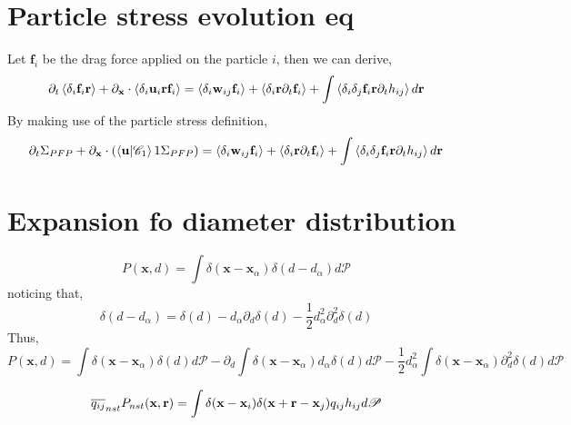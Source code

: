 \section*{Particle stress evolution eq}
Let $\textbf{f}_i$ be the drag force applied on the particle $i$, then we can derive,
\begin{equation*}
    \partial_t \left<\delta_i \textbf{f}_i\textbf{r}\right> 
  + \partial_\textbf{x} \cdot \left<\delta_i\textbf{u}_i \textbf{r} \textbf{f}_i\right>
  = \left<\delta_i\textbf{w}_{ij} \textbf{f}_i\right>
  + \left<\delta_i\textbf{r}\partial_t  \textbf{f}_i\right> 
  + \int\left<\delta_i\delta_{j} \textbf{f}_i\textbf{r}\partial_t h_{ij} \right>d\textbf{r}
\end{equation*}
By making use of the particle stress definition, 
\begin{equation*}
    \partial_t \Sigma_{PFP}
  + \partial_\textbf{x} \cdot \left(
    \left<\textbf{u} | \mathscr{C}_1\right>{1} \Sigma_{PFP}
  \right)
  = \left<\delta_i\textbf{w}_{ij} \textbf{f}_i\right>
  + \left<\delta_i\textbf{r}\partial_t  \textbf{f}_i\right> 
  + \int \left<\delta_i\delta_{j} \textbf{f}_i\textbf{r}\partial_t h_{ij}\right>d\textbf{r}
\end{equation*}


\section{Expansion fo diameter distribution}

\begin{equation}
    P(\textbf{x},d) 
    = \int \delta(\textbf{x} - \textbf{x}_\alpha)
    \delta(d - d_\alpha) d \mathscr{P}
\end{equation}
noticing that, 
\begin{equation}
    \delta(d - d_\alpha)
    = \delta(d) 
    -d_\alpha \partial_d \delta(d) 
    -\frac{1}{2}d^2_\alpha \partial^2_d \delta(d) 
\end{equation}
Thus, 
\begin{equation}
    P(\textbf{x},d) 
    = 
    \int \delta(\textbf{x} - \textbf{x}_\alpha)
    \delta(d) 
    d \mathscr{P}
    -  \partial_d \int \delta(\textbf{x} - \textbf{x}_\alpha)
    d_\alpha \delta(d) 
    d \mathscr{P}
    -\frac{1}{2}d^2_\alpha \int \delta(\textbf{x} - \textbf{x}_\alpha)
     \partial^2_d \delta(d)
     d \mathscr{P}
\end{equation}







\begin{equation*}
    \overline{q_{ij}}_{nst} P_{nst}(\textbf{x},\textbf{r})
    = \int\delta(\textbf{x} - \textbf{x}_i) \delta(\textbf{x}+\textbf{r}-\textbf{x}_j) q_{ij} h_{ij} d\mathscr{P} 
\end{equation*}


